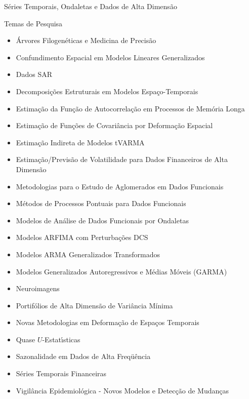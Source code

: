 \documentclass[11pt]{article}
\begin{document}
\vspace{1cm}
\thispagestyle{empty}

\begin{center}
{\huge S\'eries Temporais, Ondaletas e  Dados de Alta Dimens\~ao}
\end{center}
\vspace*{1cm}
{\sc Temas de Pesquisa}
\begin{itemize}
\item \'Arvores Filogen\'eticas e Medicina de Precis\~ao
\item Confundimento Espacial em Modelos Lineares Generalizados
\item Dados SAR
\item Decomposi\c {c}\~oes Estruturais em Modelos Espa\c {c}o-Temporais
\item Estima\c {c}\~ao da Fun\c {c}\~ao de Autocorrela\c {c}\~ao em Processos de Mem\'oria Longa
\item Estima\c {c}\~{a}o de Fun\c {c}\~{o}es de Covari\^{a}ncia por Deforma\c {c}\~{a}o Espacial
\item Estima\c c\~ao Indireta de Modelos tVARMA
\item Estima\c {c}\~ao/Previs\~ao de Volatilidade para Dados Financeiros de Alta Dimens\~ao
\item Metodologias para o Estudo de Aglomerados em Dados Funcionais
\item M\'etodos de Processos Pontuais para Dados Funcionais
\item Modelos de An\'alise de Dados Funcionais por Ondaletas
\item Modelos ARFIMA com Perturba\c {c}\~oes DCS
\item Modelos ARMA Generalizados Transformados
\item Modelos Generalizados Autoregressivos e M\'edias M\'oveis (GARMA)
\item Neuroimagens
\item Portif\'olios de Alta Dimens\~ao de Vari\^ancia M\'inima
\item Novas Metodologias em Deforma\c c\~ao de Espa\c cos Temporais
\item Quase $U$-Estat\'{\i }sticas
\item Sazonalidade em Dados de Alta Freq\"u\^encia
\item S\'eries Temporais Financeiras
\item Vigil\^ancia Epidemiol\'ogica - Novos Modelos e Detec\c {c}\~ao de Mudan\c {c}as
\end{itemize}
\end{document}
